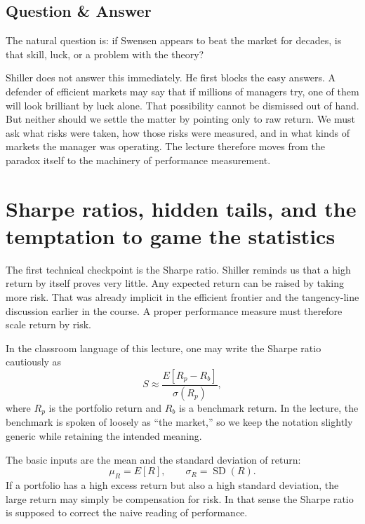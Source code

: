 \subsection{Question \& Answer}

The natural question is: if Swensen appears to beat the market for decades, is that skill, luck, or a problem with the theory?

Shiller does not answer this immediately. He first blocks the easy answers. A defender of efficient markets may say that if millions of managers try, one of them will look brilliant by luck alone. That possibility cannot be dismissed out of hand. But neither should we settle the matter by pointing only to raw return. We must ask what risks were taken, how those risks were measured, and in what kinds of markets the manager was operating. The lecture therefore moves from the paradox itself to the machinery of performance measurement.

\section{Sharpe ratios, hidden tails, and the temptation to game the statistics}

The first technical checkpoint is the Sharpe ratio. Shiller reminds us that a high return by itself proves very little. Any expected return can be raised by taking more risk. That was already implicit in the efficient frontier and the tangency-line discussion earlier in the course. A proper performance measure must therefore scale return by risk.

In the classroom language of this lecture, one may write the Sharpe ratio cautiously as
\begin{equation}
S \approx \frac{E[R_p - R_b]}{\sigma(R_p)},
\end{equation}
where \(R_p\) is the portfolio return and \(R_b\) is a benchmark return. In the lecture, the benchmark is spoken of loosely as ``the market,'' so we keep the notation slightly generic while retaining the intended meaning.

The basic inputs are the mean and the standard deviation of return:
\begin{equation}
\mu_R = E[R], \qquad \sigma_R = \operatorname{SD}(R).
\end{equation}
If a portfolio has a high excess return but also a high standard deviation, the large return may simply be compensation for risk. In that sense the Sharpe ratio is supposed to correct the naive reading of performance.

